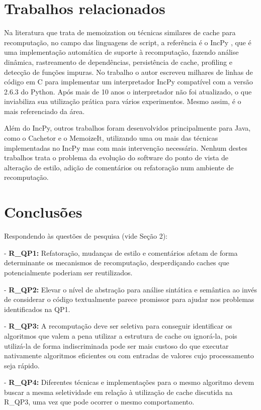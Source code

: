 \documentclass[sigconf]{acmart}
\begin{document}
\section{Trabalhos relacionados}
Na literatura que trata de memoization ou técnicas similares de cache para recomputação, no campo das linguagens de script, a referência é o IncPy \cite{guo2011using}, que é uma implementação automática de suporte à recomputação, fazendo análise dinâmica, rastreamento de dependências, persistência de cache, profiling e detecção de funções impuras. No trabalho o autor escreveu milhares de linhas de código em C para implementar um interpretador IncPy compatível com a versão 2.6.3 do Python. Após mais de 10 anos o interpretador não foi atualizado, o que inviabiliza sua utilização prática para vários experimentos. Mesmo assim, é o mais referenciado da área.

Além do IncPy, outros trabalhos foram desenvolvidos principalmente para Java, como o Cachetor\cite{nguyen2013cachetor} e o MemoizeIt\cite{della2015performance}, utilizando uma ou mais das técnicas implementadas no IncPy mas com mais intervenção necessária. Nenhum destes trabalhos trata o problema da evolução do software do ponto de vista de alteração de estilo, adição de comentários ou refatoração num ambiente de recomputação.

\section{Conclusões}
Respondendo às questões de pesquisa (vide Seção 2):

- \textbf{R\_QP1:} Refatoração, mudanças de estilo e comentários afetam de forma determinante os mecanismos de recomputação, desperdiçando caches que potencialmente poderiam ser reutilizados.

- \textbf{R\_QP2:} Elevar o nível de abstração para análise sintática e semântica ao invés de considerar o código textualmente parece promissor para ajudar nos problemas identificados na QP1.

- \textbf{R\_QP3:} A recomputação deve ser seletiva para conseguir identificar os algoritmos que valem a pena utilizar a estrutura de cache ou ignorá-la, pois utilizá-la de forma indiscriminada pode ser mais custoso do que executar nativamente algoritmos eficientes ou com entradas de valores cujo processamento seja rápido.

- \textbf{R\_QP4:} Diferentes técnicas e implementações para o mesmo algoritmo devem buscar a mesma seletividade em relação à utilização de cache discutida na R\_QP3, uma vez que pode ocorrer o mesmo comportamento.
\end{document}
